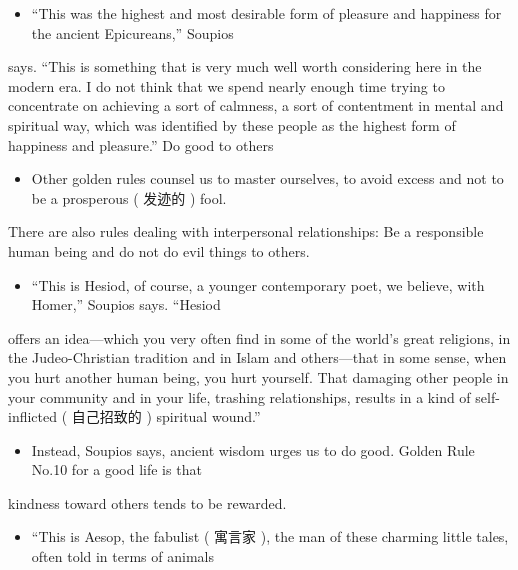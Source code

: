 \documentclass[UTF8,11pt]{ctexart}
\begin{document}
\begin{itemize}[leftmargin=2em,itemsep=.2em,topsep=.4em]\item[H.] “This was the highest and most desirable form of pleasure and happiness for the ancient Epicureans,” Soupios
\end{itemize}

says. “This is something that is very much well worth considering here in the modern era. I do not think that we spend nearly enough time trying to concentrate on achieving a sort of calmness, a sort of contentment in mental and spiritual way, which was identified by these people as the highest form of happiness and pleasure.” Do good to others


\begin{itemize}[leftmargin=2em,itemsep=.2em,topsep=.4em]\item[I.] Other golden rules counsel us to master ourselves, to avoid excess and not to be a prosperous ( 发迹的 ) fool.
\end{itemize}

There are also rules dealing with interpersonal relationships: Be a responsible human being and do not do evil things to others.


\begin{itemize}[leftmargin=2em,itemsep=.2em,topsep=.4em]\item[J.] “This is Hesiod, of course, a younger contemporary poet, we believe, with Homer,” Soupios says. “Hesiod
\end{itemize}

offers an idea—which you very often find in some of the world’s great religions, in the Judeo-Christian tradition and in Islam and others—that in some sense, when you hurt another human being, you hurt yourself. That damaging other people in your community and in your life, trashing relationships, results in a kind of self-inflicted ( 自己招致的 ) spiritual wound.”


\begin{itemize}[leftmargin=2em,itemsep=.2em,topsep=.4em]\item[K.] Instead, Soupios says, ancient wisdom urges us to do good. Golden Rule No.10 for a good life is that
\end{itemize}

kindness toward others tends to be rewarded.


\begin{itemize}[leftmargin=2em,itemsep=.2em,topsep=.4em]\item[L.] “This is Aesop, the fabulist ( 寓言家 ), the man of these charming little tales, often told in terms of animals
\end{itemize}
\end{document}
